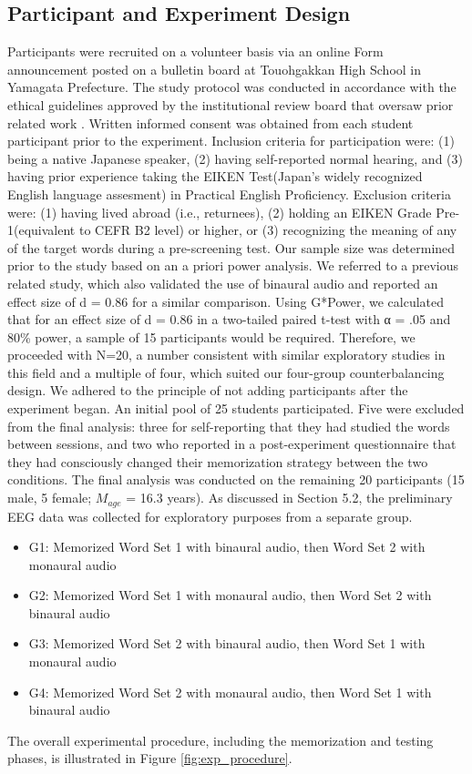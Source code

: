 \documentclass{ehissymp}
\begin{document}
\subsection{Participant and Experiment Design}
Participants were recruited on a volunteer basis via an online Form announcement posted on a bulletin board at Touohgakkan High School in Yamagata Prefecture. The study protocol was conducted in accordance with the ethical guidelines approved by the institutional review board that oversaw prior related work \cite{Fukushima2019}. Written informed consent was obtained from each student participant prior to the experiment. Inclusion criteria for participation were: (1) being a native Japanese speaker, (2) having self-reported normal hearing, and (3) having prior experience taking the EIKEN Test(Japan's widely recognized English language assesment) in Practical English Proficiency. Exclusion criteria were: (1) having lived abroad (i.e., returnees), (2) holding an EIKEN Grade Pre-1(equivalent to CEFR B2 level) or higher, or (3) recognizing the meaning of any of the target words during a pre-screening test. 
Our sample size was determined prior to the study based on an a priori power analysis. We referred to a previous related study\cite{Fukushima2019}, which also validated the use of binaural audio and reported an effect size of d = 0.86 for a similar comparison. Using G*Power, we calculated that for an effect size of d = 0.86 in a two-tailed paired t-test with α = .05 and 80\% power, a sample of 15 participants would be required. Therefore, we proceeded with N=20, a number consistent with similar exploratory studies in this field and a multiple of four, which suited our four-group counterbalancing design. We adhered to the principle of not adding participants after the experiment began. 
An initial pool of 25 students participated. Five were excluded from the final analysis: three for self-reporting that they had studied the words between sessions, and two who reported in a post-experiment questionnaire that they had consciously changed their memorization strategy between the two conditions. The final analysis was conducted on the remaining 20 participants (15 male, 5 female; $M_{age}$ = 16.3 years). As discussed in Section 5.2, the preliminary EEG data was collected for exploratory purposes from a separate group.

\begin{itemize}
  \item G1: Memorized Word Set 1 with binaural audio, then Word Set 2 with monaural audio
  \item G2: Memorized Word Set 1 with monaural audio, then Word Set 2 with binaural audio
  \item G3: Memorized Word Set 2 with binaural audio, then Word Set 1 with monaural audio
  \item G4: Memorized Word Set 2 with monaural audio, then Word Set 1 with binaural audio
\end{itemize}
The overall experimental procedure, including the memorization and testing phases, is illustrated in Figure \ref{fig:exp_procedure}.
\end{document}
